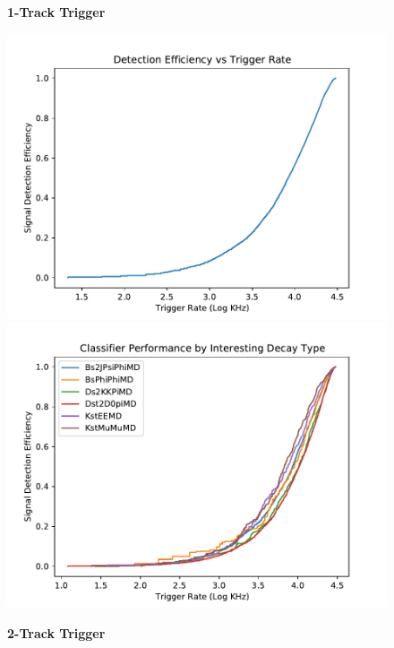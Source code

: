 \documentclass[12pt, letterpaper]{article}
\begin{document}
\begin{figure}
\begin{center}
\textbf{1-Track Trigger}\\
\end{center}
\begin{minipage}[b]{0.5\textwidth}
\includegraphics[width=1\textwidth]{1trackRoc.pdf}
\end{minipage}
\begin{minipage}[b]{0.5\textwidth}
\includegraphics[width=1\textwidth]{1trackDecayRoc.pdf}
\end{minipage}
\begin{center}
\textbf{2-Track Trigger}\\
\end{center}

\end{figure}
\end{document}
